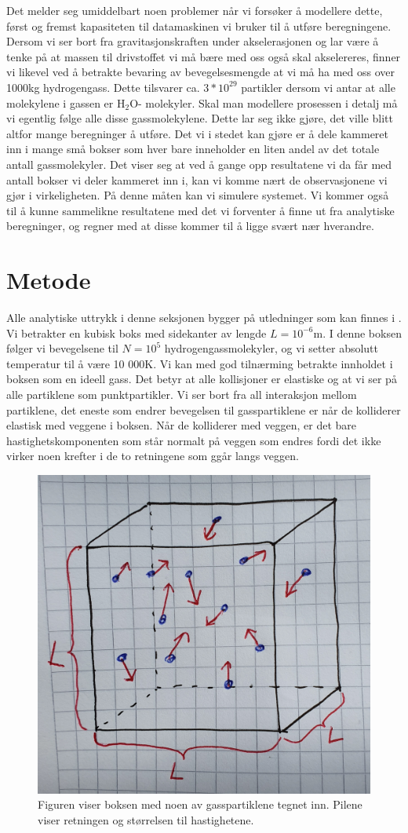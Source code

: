 \documentclass[reprint,english,notitlepage]{revtex4-1}  %
\begin{document}
Det melder seg umiddelbart noen problemer når vi forsøker å modellere dette, først og
 fremst kapasiteten til datamaskinen vi bruker til å utføre beregningene. Dersom vi ser
 bort fra gravitasjonskraften under akselerasjonen og lar være å tenke på at massen til
 drivstoffet vi må bære med oss også skal akselereres, finner vi likevel ved å betrakte
 bevaring av bevegelsesmengde at vi må ha med oss over 1000kg hydrogengass. Dette
 tilsvarer ca. $3*10^{29}$ partikler dersom vi antar at alle molekylene i gassen er H$_2$O-
 molekyler. Skal man modellere prosessen i detalj må vi egentlig følge alle disse
 gassmolekylene. Dette lar seg ikke gjøre, det ville blitt altfor mange beregninger å
 utføre. Det vi i stedet kan gjøre er å dele kammeret inn i mange små bokser som hver bare
 inneholder en liten andel av det totale antall gassmolekyler. Det viser seg at ved å
 gange opp resultatene vi da får med antall bokser vi deler kammeret inn i, kan vi komme
 nært de observasjonene vi gjør i virkeligheten\citep{part1A}. På denne måten kan vi
 simulere systemet. Vi kommer også til å kunne sammelikne resultatene med det vi forventer
 å finne ut fra analytiske beregninger, og regner med at disse kommer til å ligge svært
 nær hverandre.


\section{Metode}

Alle analytiske uttrykk i denne seksjonen bygger på utledninger som kan finnes i
 \citep{part1A}. Vi betrakter en kubisk boks med sidekanter av lengde $L = 10^{-6}$m. I denne boksen følger vi bevegelsene til $N = 10^5$ hydrogengassmolekyler, og vi setter absolutt temperatur til å være 10 000K. Vi kan med god tilnærming betrakte innholdet i boksen som en ideell gass. Det betyr at alle kollisjoner er elastiske og at vi ser på alle partiklene som punktpartikler. Vi ser bort fra all interaksjon mellom partiklene, det eneste som endrer bevegelsen til gasspartiklene er når de kolliderer elastisk med veggene i boksen. Når de kolliderer med veggen, er det bare hastighetskomponenten som står normalt på veggen som endres fordi det ikke virker noen krefter i de to retningene som ggår langs veggen.

\begin{figure}[htbp]
\includegraphics[width=0.5\linewidth]{boks.jpg}
\caption{Figuren viser boksen med noen av gasspartiklene tegnet inn. Pilene viser retningen og størrelsen til hastighetene.\label{fig:boks}}
\end{figure}
\end{document}
